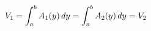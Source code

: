 \documentclass[preview]{standalone}
\begin{document}
\begin{align*}
\special{dvisvgm:raw <g id='unique000'>}V_1 = \int_a^b A_1(y)\,dy = \int_a^b A_2(y)\,dy = V_2\special{dvisvgm:raw </g>}
\end{align*}
\end{document}
